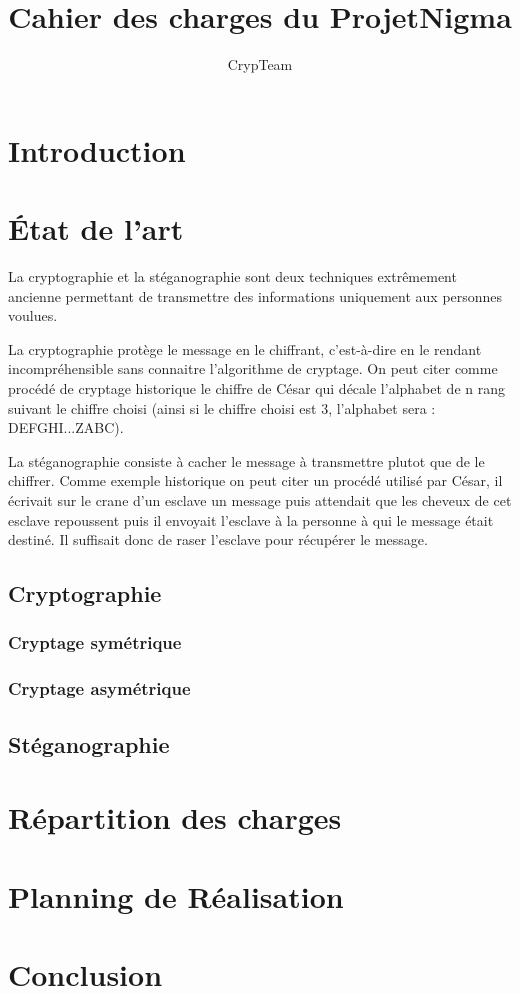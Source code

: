 \documentclass[a4paper,12pt]{article}
\title{Cahier des charges du ProjetNigma}
\author{CrypTeam}
\date{}
\begin{document}
	\maketitle{}
  	\tableofcontents
	\newpage				
	\section{Introduction}
	\newpage
	\section{\'{E}tat de l'art}
		La cryptographie et la stéganographie sont deux techniques extrêmement ancienne permettant de transmettre des informations uniquement aux personnes voulues.

 La cryptographie protège le message en le chiffrant, c'est-à-dire en le rendant incompréhensible sans connaitre l'algorithme de cryptage. On peut citer comme procédé de cryptage historique le chiffre de César qui décale l'alphabet de n rang suivant le chiffre choisi (ainsi si le chiffre choisi est 3, l'alphabet sera : DEFGHI...ZABC).

	La stéganographie consiste à cacher le message à transmettre plutot que de le chiffrer. Comme exemple historique on peut citer un procédé utilisé par César, il écrivait sur le crane d'un esclave un message puis attendait que les cheveux de cet esclave repoussent puis il envoyait l'esclave à la personne à qui le message était destiné. Il suffisait donc de raser l'esclave pour récupérer le message.
		\subsection{Cryptographie}
			\subsubsection{Cryptage symétrique}

			\subsubsection{Cryptage asymétrique}

		\subsection{Stéganographie}
	\newpage
	\section{Répartition des charges}
	\section{Planning de Réalisation} %
	\section{Conclusion}
\end{document}
